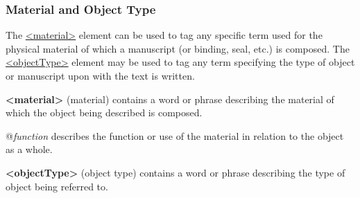 \subsubsection[{Material and Object Type}]{Material and Object Type}\label{msmat}\par
The \hyperref[TEI.material]{<material>} element can be used to tag any specific term used for the physical material of which a manuscript (or binding, seal, etc.) is composed. The \hyperref[TEI.objectType]{<objectType>} element may be used to tag any term specifying the type of object or manuscript upon with the text is written. 
\begin{sansreflist}
  
\item [\textbf{<material>}] (material) contains a word or phrase describing the material of which the object being described is composed.\hfil\\[-10pt]\begin{sansreflist}
    \item[@{\itshape function}]
  describes the function or use of the material in relation to the object as a whole.
\end{sansreflist}  
\item [\textbf{<objectType>}] (object type) contains a word or phrase describing the type of object being referred to.
\end{sansreflist}
\par
